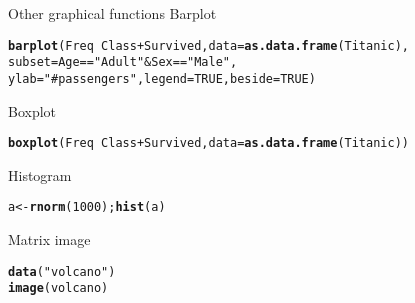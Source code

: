 \documentclass[10pt]{beamer}\usepackage[]{graphicx}\usepackage[]{color}
\makeatletter
\newcommand{\hlnum}[1]{\textcolor[rgb]{0.686,0.059,0.569}{#1}}%
\newcommand{\hlstr}[1]{\textcolor[rgb]{0.192,0.494,0.8}{#1}}%
\newcommand{\hlopt}[1]{\textcolor[rgb]{0,0,0}{#1}}%
\newcommand{\hlstd}[1]{\textcolor[rgb]{0.345,0.345,0.345}{#1}}%
\newcommand{\hlkwb}[1]{\textcolor[rgb]{0.69,0.353,0.396}{#1}}%
\newcommand{\hlkwc}[1]{\textcolor[rgb]{0.333,0.667,0.333}{#1}}%
\newcommand{\hlkwd}[1]{\textcolor[rgb]{0.737,0.353,0.396}{\textbf{#1}}}%
\newenvironment{kframe}{%
 \def\at@end@of@kframe{}%
 \ifinner\ifhmode%
  \def\at@end@of@kframe{\end{minipage}}%
  \begin{minipage}{\columnwidth}%
 \fi\fi%
 \def\FrameCommand##1{\hskip\@totalleftmargin \hskip-\fboxsep
 \colorbox{shadecolor}{##1}\hskip-\fboxsep
     \hskip-\linewidth \hskip-\@totalleftmargin \hskip\columnwidth}%
 \MakeFramed {\advance\hsize-\width
   \@totalleftmargin\z@ \linewidth\hsize
   \@setminipage}}%
 {\par\unskip\endMakeFramed%
 \at@end@of@kframe}
\newenvironment{knitrout}{}{} %
\makeatother
\begin{document}
\begin{frame}[fragile]{Other graphical functions}
Barplot
\begin{knitrout}
\color{fgcolor}\begin{kframe}
\begin{alltt}
\hlkwd{barplot}\hlstd{(Freq} \hlopt{~} \hlstd{Class} \hlopt{+} \hlstd{Survived,} \hlkwc{data} \hlstd{=} \hlkwd{as.data.frame}\hlstd{(Titanic),}
       \hlkwc{subset} \hlstd{= Age} \hlopt{==} \hlstr{"Adult"} \hlopt{&} \hlstd{Sex} \hlopt{==} \hlstr{"Male"}\hlstd{,}
       \hlkwc{ylab} \hlstd{=} \hlstr{"# passengers"}\hlstd{,} \hlkwc{legend} \hlstd{=} \hlnum{TRUE}\hlstd{,} \hlkwc{beside}\hlstd{=}\hlnum{TRUE}\hlstd{)}
\end{alltt}
\end{kframe}
\end{knitrout}
\pause
Boxplot
\begin{knitrout}
\color{fgcolor}\begin{kframe}
\begin{alltt}
\hlkwd{boxplot}\hlstd{(Freq} \hlopt{~} \hlstd{Class} \hlopt{+} \hlstd{Survived,}\hlkwc{data} \hlstd{=} \hlkwd{as.data.frame}\hlstd{(Titanic))}
\end{alltt}
\end{kframe}
\end{knitrout}
\pause
Histogram
\begin{knitrout}
\color{fgcolor}\begin{kframe}
\begin{alltt}
\hlstd{a} \hlkwb{<-} \hlkwd{rnorm}\hlstd{(}\hlnum{1000}\hlstd{);} \hlkwd{hist}\hlstd{(a)}
\end{alltt}
\end{kframe}
\end{knitrout}
\pause
Matrix image
\begin{knitrout}
\color{fgcolor}\begin{kframe}
\begin{alltt}
\hlkwd{data}\hlstd{(}\hlstr{"volcano"}\hlstd{)}
\hlkwd{image}\hlstd{(volcano)}
\end{alltt}
\end{kframe}
\end{knitrout}

\end{frame}
\end{document}
